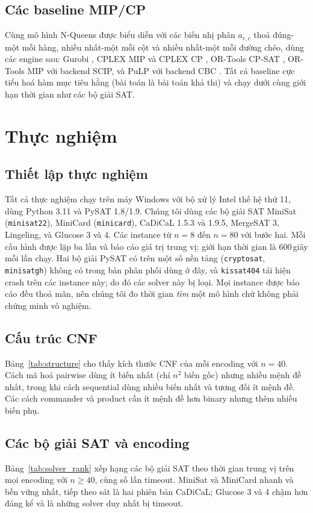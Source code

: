 \documentclass[a4paper,fleqn]{cas-sc}
\begin{document}
\subsection{Các baseline MIP/CP}
Cùng mô hình N-Queens được biểu diễn với các biến nhị phân $a_{r,c}$ thoả đúng-một
mỗi hàng, nhiều nhất-một mỗi cột và nhiều nhất-một mỗi đường chéo, dùng các engine
sau: Gurobi \citep{Gurobi2024}, CPLEX MIP và CPLEX CP \citep{IBM2022}, OR-Tools
CP-SAT \citep{ORtools2023}, OR-Tools MIP với backend SCIP, và PuLP với backend CBC
\citep{ForrestCBC}. Tất cả baseline cực tiểu hoá hàm mục tiêu hằng (bài toán là
bài toán khả thi) và chạy dưới cùng giới hạn thời gian như các bộ giải SAT.

\section{Thực nghiệm}\label{sec:experiments}

\subsection{Thiết lập thực nghiệm}
Tất cả thực nghiệm chạy trên máy Windows với bộ xử lý Intel thế hệ thứ 11, dùng
Python 3.11 và PySAT 1.8/1.9. Chúng tôi dùng các bộ giải SAT MiniSat
(\texttt{minisat22}), MiniCard (\texttt{minicard}), CaDiCaL 1.5.3 và 1.9.5,
MergeSAT 3, Lingeling, và Glucose 3 và 4. Các instance từ $n=8$ đến $n=80$ với
bước hai. Mỗi cấu hình được lặp ba lần và báo cáo giá trị trung vị; giới hạn thời
gian là 600\,giây mỗi lần chạy. Hai bộ giải PySAT có trên một số nền tảng
(\texttt{cryptosat}, \texttt{minisatgh}) không có trong bản phân phối dùng ở đây,
và \texttt{kissat404} tái hiện crash trên các instance này; do đó các solver này
bị loại. Mọi instance được báo cáo đều thoả mãn, nên chúng tôi đo thời gian
\emph{tìm} một mô hình chứ không phải chứng minh vô nghiệm.

\subsection{Cấu trúc CNF}
Bảng~\ref{tab:structure} cho thấy kích thước CNF của mỗi encoding với $n=40$. Cách
mã hoá pairwise dùng ít biến nhất (chỉ $n^2$ biến gốc) nhưng nhiều mệnh đề nhất,
trong khi cách sequential dùng nhiều biến nhất và tương đối ít mệnh đề. Các cách
commander và product cần ít mệnh đề hơn binary nhưng thêm nhiều biến phụ.



\subsection{Các bộ giải SAT và encoding}
Bảng~\ref{tab:solver_rank} xếp hạng các bộ giải SAT theo thời gian trung vị trên
mọi encoding với $n\geq 40$, cùng số lần timeout. MiniSat và MiniCard nhanh và bền
vững nhất, tiếp theo sát là hai phiên bản CaDiCaL; Glucose 3 và 4 chậm hơn đáng kể
và là những solver duy nhất bị timeout.
\end{document}
